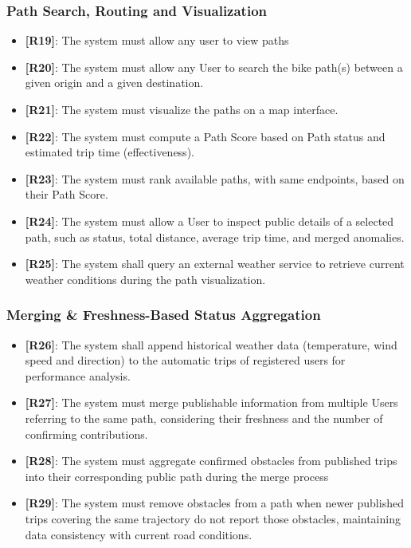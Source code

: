 \subsubsection{Path Search, Routing and Visualization}

\begin{itemize}
    \item \textbf{[R19]}: The system must allow any user to view paths
    \item \textbf{[R20]}: The system must allow any User to search the bike path(s) between a given origin and a given destination.
    \item \textbf{[R21]}: The system must visualize the paths on a map interface.
    \item \textbf{[R22]}: The system must compute a Path Score based on Path status and estimated trip time (effectiveness).
    \item \textbf{[R23]}: The system must rank available paths, with same endpoints, based on their Path Score.
    \item \textbf{[R24]}: The system must allow a User to inspect public details of a selected path, such as status, total distance, average trip time, and merged anomalies.
    \item \textbf{[R25]}: The system shall query an external weather service to retrieve current weather conditions during the path visualization.
\end{itemize}

\subsubsection{Merging \& Freshness-Based Status Aggregation}

\begin{itemize}
    \item \textbf{[R26]}: The system shall append historical weather data (temperature, wind speed and direction) to the automatic trips of registered users for performance analysis.
    \item \textbf{[R27]}: The system must merge publishable information from multiple Users referring to the same path, considering their freshness and the number of confirming contributions.
    \item \textbf{[R28]}: The system must aggregate confirmed obstacles from published trips into their corresponding public path during the merge process
    \item \textbf{[R29]}: The system must remove obstacles from a path when newer published trips covering the same trajectory do not report those obstacles, maintaining data consistency with current road conditions.
\end{itemize}

